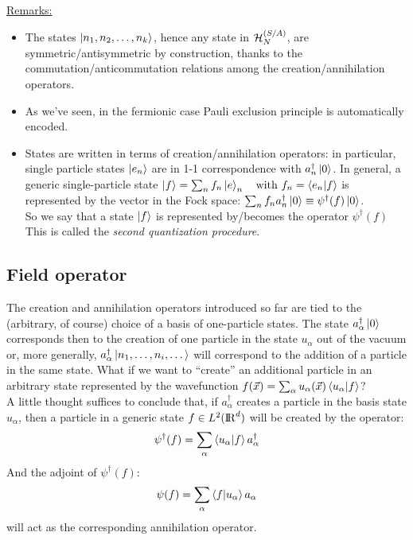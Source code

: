 \underline{Remarks:}
\begin{itemize}
    \item The states $\left|n_1,n_2, \dots, n_k\right\rangle$, hence any state in $\mathcal{H}_N^{(S/A)}$, are symmetric/antisymmetric by construction, thanks to the commutation/anticommutation relations among the creation/annihilation operators.
    \item As we've seen, in the fermionic case Pauli exclusion principle is automatically encoded.
    \item States are written in terms of creation/annihilation operators: in particular, single particle states $\left|e_n\right\rangle$ are in 1-1 correspondence with $a_n^\dag\left|0\right\rangle$. In general, a generic single-particle state $\left|f\right\rangle = \sum_n f_n\left|e\right\rangle_n \quad \text{with } f_n = \left\langle e_n \middle| f \right\rangle$ is represented by the vector in the Fock space: $\sum_n f_n a_n^\dag \left|0\right\rangle \equiv \psi^\dag (f)\left|0\right\rangle$.\\
    So we say that a state $\left|f\right\rangle$ is represented by/becomes the operator $\psi^\dag (f)$\\
    This is called the \textit{second quantization procedure}.
\end{itemize}

\subsection{Field operator}
The creation and annihilation operators introduced so far are tied to the (arbitrary, of course) choice of a basis of one-particle states. The state $a_\alpha^\dag\left|0\right\rangle$ corresponds then to the creation of one particle in the state $u_\alpha$ out of the vacuum or, more generally, $a_\alpha^\dag \left|n_1,\dots, n_i,\dots\right\rangle$ will correspond to the addition of a particle in the same state. What if we want to “create” an additional particle in an arbitrary state represented by the wavefunction $f(\vec x) = \sum_\alpha u_\alpha(\vec x) \left\langle u_\alpha \middle| f \right\rangle$?\\
A little thought suffices to conclude that, if $a_\alpha^\dag$ creates a particle in the basis state $u_\alpha$, then a particle in a generic state $f \in L^2({\rm I\!R}^d)$ will be created by the operator: 
\begin{equation}\label{eq:creation}
    \psi^\dag(f) = \sum_\alpha \left\langle u_\alpha \middle| f \right\rangle a_\alpha^\dag
\end{equation}
And the adjoint of $\psi^\dag(f)$:  
\begin{equation}\label{eq:annihilation}
    \psi(f) = \sum_\alpha \left\langle f \middle| u_\alpha \right\rangle a_\alpha    
\end{equation}
will act as the corresponding annihilation operator.

